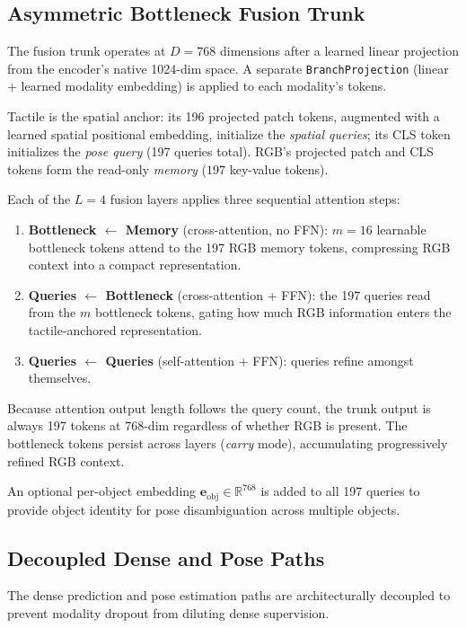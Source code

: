 \subsection{Asymmetric Bottleneck Fusion Trunk}
\label{sec:trunk}

The fusion trunk operates at $D{=}768$ dimensions after a learned linear
projection from the encoder's native 1024-dim space. A separate
\texttt{BranchProjection} (linear + learned modality embedding) is applied to
each modality's tokens.

Tactile is the spatial anchor: its 196 projected patch tokens, augmented with
a learned spatial positional embedding, initialize the \emph{spatial queries};
its CLS token initializes the \emph{pose query} (197 queries total). RGB's
projected patch and CLS tokens form the read-only \emph{memory}
($197$ key-value tokens).

Each of the $L{=}4$ fusion layers applies three sequential attention steps:
\begin{enumerate}
\item \textbf{Bottleneck $\leftarrow$ Memory} (cross-attention, no FFN):
      $m{=}16$ learnable bottleneck tokens attend to the 197 RGB memory tokens,
      compressing RGB context into a compact representation.
\item \textbf{Queries $\leftarrow$ Bottleneck} (cross-attention + FFN):
      the 197 queries read from the $m$ bottleneck tokens, gating how much RGB
      information enters the tactile-anchored representation.
\item \textbf{Queries $\leftarrow$ Queries} (self-attention + FFN):
      queries refine amongst themselves.
\end{enumerate}
Because attention output length follows the query count, the trunk output is
always 197 tokens at 768-dim regardless of whether RGB is present. The
bottleneck tokens persist across layers (\emph{carry} mode), accumulating
progressively refined RGB context.

An optional per-object embedding $\mathbf{e}_{\mathrm{obj}} \in
\mathbb{R}^{768}$ is added to all 197 queries to provide object identity for
pose disambiguation across multiple objects.

\subsection{Decoupled Dense and Pose Paths}
\label{sec:decoupled}

The dense prediction and pose estimation paths are architecturally decoupled
to prevent modality dropout from diluting dense supervision.

